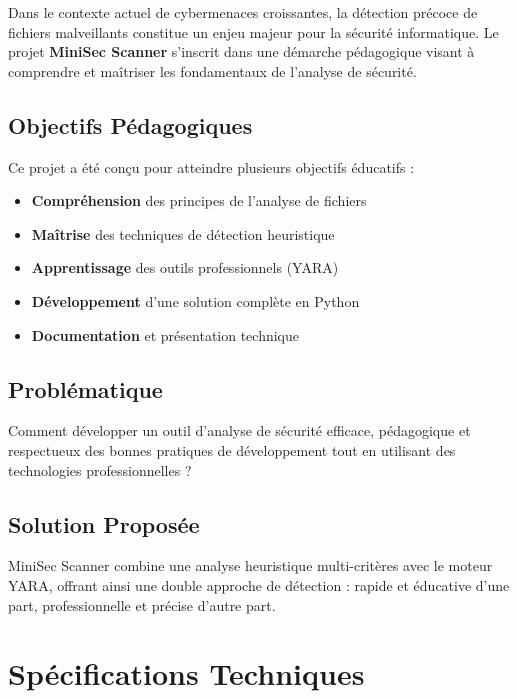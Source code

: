 \documentclass[12pt,a4paper]{report}
\begin{document}
Dans le contexte actuel de cybermenaces croissantes, la détection précoce de fichiers malveillants constitue un enjeu majeur pour la sécurité informatique. Le projet \textbf{MiniSec Scanner} s'inscrit dans une démarche pédagogique visant à comprendre et maîtriser les fondamentaux de l'analyse de sécurité.

\section{Objectifs Pédagogiques}

Ce projet a été conçu pour atteindre plusieurs objectifs éducatifs :

\begin{itemize}
    \item \textbf{Compréhension} des principes de l'analyse de fichiers
    \item \textbf{Maîtrise} des techniques de détection heuristique
    \item \textbf{Apprentissage} des outils professionnels (YARA)
    \item \textbf{Développement} d'une solution complète en Python
    \item \textbf{Documentation} et présentation technique
\end{itemize}

\section{Problématique}

Comment développer un outil d'analyse de sécurité efficace, pédagogique et respectueux des bonnes pratiques de développement tout en utilisant des technologies professionnelles ?

\section{Solution Proposée}

MiniSec Scanner combine une analyse heuristique multi-critères avec le moteur YARA, offrant ainsi une double approche de détection : rapide et éducative d'une part, professionnelle et précise d'autre part.

\chapter{Spécifications Techniques}
\end{document}
